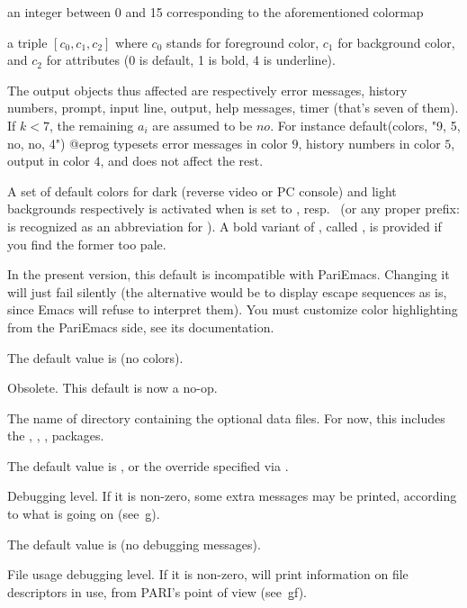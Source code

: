 {\noindent\item an integer between 0 and 15 corresponding to the
aforementioned colormap

\noindent\item a triple $[c_0,c_1,c_2]$ where $c_0$ stands for foreground
color, $c_1$ for background color, and $c_2$ for attributes (0 is default, 1
is bold, 4 is underline).

The output objects thus affected are respectively error messages,
history numbers, prompt, input line, output, help messages, timer (that's
seven of them). If $k < 7$, the remaining $a_i$ are assumed to be $no$. For
instance
%
\bprog
default(colors, "9, 5, no, no, 4")
@eprog
\noindent
typesets error messages in color $9$, history numbers in color $5$, output in
color $4$, and does not affect the rest.

A set of default colors for dark (reverse video or PC console) and light
backgrounds respectively is activated when  is set to
, resp.~ (or any proper prefix:  is
recognized as an abbreviation for ). A bold variant of
, called , is provided if you find the former too
pale.

\emacs In the present version, this default is incompatible with PariEmacs.
Changing it will just fail silently (the alternative would be to display
escape sequences as is, since Emacs will refuse to interpret them).
You must customize color highlighting from the PariEmacs side, see its
documentation.

The default value is  (no colors).

\label{se:def,compatible}
Obsolete. This default is now a no-op.

\label{se:def,datadir}
The name of directory containing the optional data files. For now,
this includes the , , , 
packages.

The default value is , or the override specified
via .

\label{se:def,debug}
Debugging level. If it is non-zero, some extra messages may be printed,
according to what is going on (see~\b{g}).

The default value is  (no debugging messages).

\label{se:def,debugfiles}
File usage debugging level. If it is non-zero,  will print
information on file descriptors in use, from PARI's point of view
(see~\b{gf}).

}
